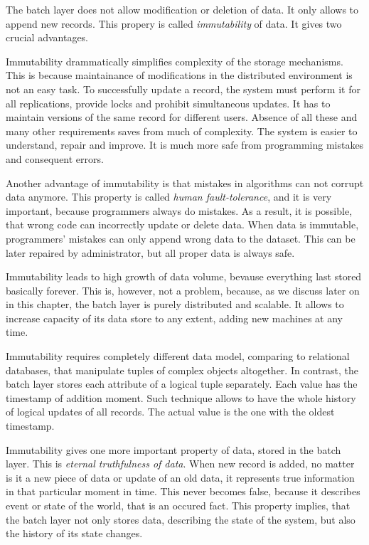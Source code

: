 The batch layer does not allow modification or deletion of data.
It only allows to append new records.
This propery is called \textit{immutability} of data.
It gives two crucial advantages.

Immutability drammatically simplifies complexity of the storage mechanisms.
This is because maintainance of modifications in the distributed environment is not an easy task.
To successfully update a record, the system must perform it for all replications, provide locks and prohibit simultaneous updates.
It has to maintain versions of the same record for different users.
Absence of all these and many other requirements saves from much of complexity.
The system is easier to understand, repair and improve.
It is much more safe from programming mistakes and consequent errors.

Another advantage of immutability is that mistakes in algorithms can not corrupt data anymore.
This property is called \textit{human fault-tolerance}, and it is very important, because programmers always do mistakes.
As a result, it is possible, that wrong code can incorrectly update or delete data.
When data is immutable, programmers' mistakes can only append wrong data to the dataset.
This can be later repaired by administrator, but all proper data is always safe.

Immutability leads to high growth of data volume, bevause everything last stored basically forever.
This is, however, not a problem, because, as we discuss later on in this chapter, the batch layer is purely distributed and scalable.
It allows to increase capacity of its data store to any extent, adding new machines at any time.

Immutability requires completely different data model, comparing to relational databases, that manipulate tuples of complex objects altogether.
In contrast, the batch layer stores each attribute of a logical tuple separately.
Each value has the timestamp of addition moment. 
Such technique allows to have the whole history of logical updates of all records.
The actual value is the one with the oldest timestamp.

Immutability gives one more important property of data, stored in the batch layer.
This is \textit{eternal truthfulness of data}.
When new record is added, no matter is it a new piece of data or update of an old data, it represents true information in that particular moment in time.
This never becomes false, because it describes event or state of the world, that is an occured fact.
This property implies, that the batch layer not only stores data, describing the state of the system, but also the history of its state changes.

